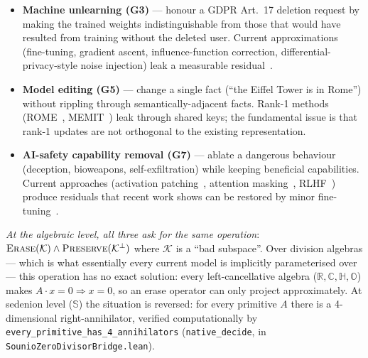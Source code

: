 \documentclass{article}
\newcommand{\sio}{\mathbb{S}}
\begin{document}
\begin{itemize}
\item \textbf{Machine unlearning (G3)} --- honour a GDPR Art.~17 deletion
      request by making the trained weights indistinguishable from those that
      would have resulted from training without the deleted user.  Current
      approximations (fine-tuning, gradient ascent, influence-function
      correction, differential-privacy-style noise injection) leak a
      measurable residual~\cite{golatkar2020eternal,neel2021descent,guo2020certified}.
\item \textbf{Model editing (G5)} --- change a single fact (``the Eiffel
      Tower is in Rome'') without rippling through semantically-adjacent
      facts.  Rank-1 methods (ROME~\cite{meng2022locating}, 
      MEMIT~\cite{meng2023massediting}) leak through shared keys; the
      fundamental issue is that rank-1 updates are not orthogonal to the
      existing representation.
\item \textbf{AI-safety capability removal (G7)} --- ablate a dangerous
      behaviour (deception, bioweapons, self-exfiltration) while keeping
      beneficial capabilities.  Current approaches (activation
      patching~\cite{heimersheim2024activation}, attention
      masking~\cite{conmy2023automatedic}, RLHF~\cite{bai2022training})
      produce residuals that recent work shows can be restored by minor
      fine-tuning~\cite{qi2024finetuning}.
\end{itemize}

\emph{At the algebraic level, all three ask for the same operation}:
$\textsc{Erase}(\mathcal{K}) \land \textsc{Preserve}(\mathcal{K}^{\perp})$
where $\mathcal{K}$ is a ``bad subspace''.  Over division algebras --- which
is what essentially every current model is implicitly parameterised over ---
this operation has no exact solution: every left-cancellative algebra
($\mathbb{R}, \mathbb{C}, \mathbb{H}, \mathbb{O}$) makes
$A \cdot x = 0 \Rightarrow x = 0$, so an erase operator can only project
approximately.  At sedenion level ($\sio$) the situation is reversed: for
every primitive $A$ there is a 4-dimensional right-annihilator, verified
computationally by \texttt{every\_primitive\_has\_4\_annihilators}
(\texttt{native\_decide}, in \texttt{SounioZeroDivisorBridge.lean}).
\end{document}

